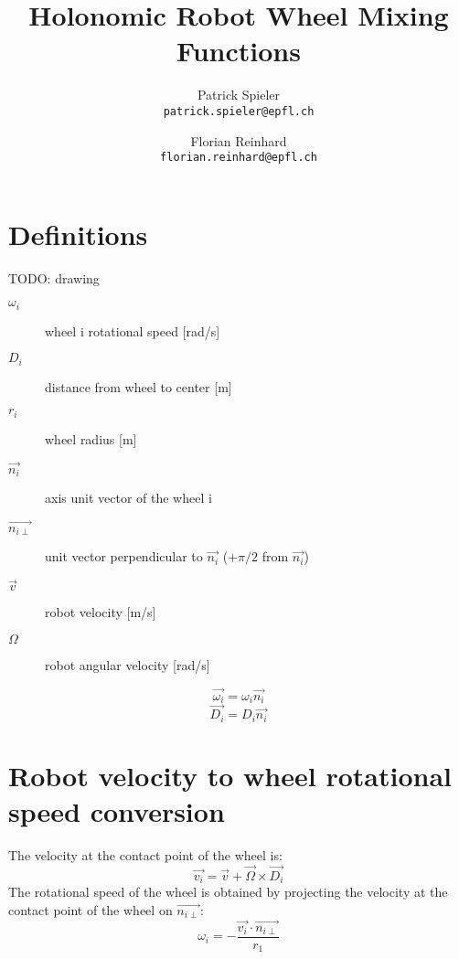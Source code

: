 \documentclass[a4paper]{paper}
\author{
Patrick Spieler \\
\texttt{patrick.spieler@epfl.ch}
\and
Florian Reinhard \\
\texttt{florian.reinhard@epfl.ch}
}
\title{Holonomic Robot Wheel Mixing Functions}
\begin{document}
\maketitle

\section{Definitions}

TODO: drawing

\begin{description}
    \item[$\omega_i$] wheel i rotational speed [rad/s]
    \item[$D_i$] distance from wheel to center [m]
    \item[$r_i$] wheel radius [m]
    \item[$\overrightarrow{n_i}$] axis unit vector of the wheel i
    \item[$\overrightarrow{n_{i\perp}}$] unit vector perpendicular to $\overrightarrow{n_i}$ ($+\pi/2$ from $\overrightarrow{n_i}$)
    \item[$\overrightarrow{v}$] robot velocity [m/s]
    \item[$\Omega$] robot angular velocity [rad/s]
\end{description}

\begin{equation}
    \overrightarrow{\omega_i} = \omega_i \overrightarrow{n_i}
\end{equation}
\begin{equation}
    \overrightarrow{D_i} = D_i \overrightarrow{n_i}
\end{equation}



\section{Robot velocity to wheel rotational speed conversion}

The velocity at the contact point of the wheel is:
\begin{equation}
    \overrightarrow{v_i} = \overrightarrow{v} + \overrightarrow{\Omega}\times\overrightarrow{D_i}
\end{equation}
The rotational speed of the wheel is obtained by projecting the velocity at
the contact point of the wheel on $\overrightarrow{n_{i\perp}}$:
\begin{equation}
    \omega_i = - \frac{\overrightarrow{v_i} \cdot \overrightarrow{n_{i\perp}}}{r_1}
\end{equation}
\end{document}
